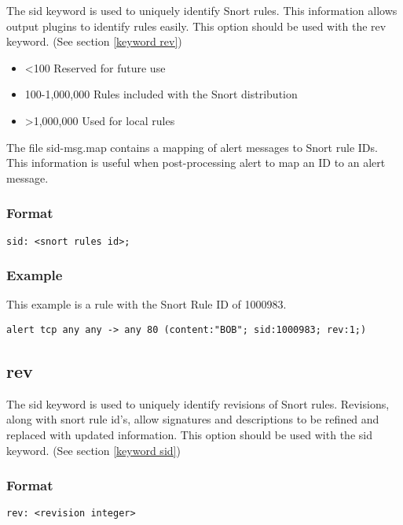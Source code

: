 \documentclass[english]{report}
\begin{document}
The sid keyword is used to uniquely identify Snort rules. This information
allows output plugins to identify rules easily.  This option should be used
with the rev keyword.  (See section \ref{keyword rev})

\begin{itemize}
\item <100 Reserved for future use
\item 100-1,000,000 Rules included with the Snort distribution
\item >1,000,000 Used for local rules
\end{itemize}

The file sid-msg.map contains a mapping of alert messages to Snort rule IDs.
This information is useful when post-processing alert to map an ID to an alert
message.  

\subsubsection{Format}

\begin{verbatim}
sid: <snort rules id>;
\end{verbatim}

\subsubsection{Example}
This example is a rule with the Snort Rule ID of 1000983.
\begin{verbatim}
alert tcp any any -> any 80 (content:"BOB"; sid:1000983; rev:1;)
\end{verbatim}

\subsection{rev \label{keyword rev}}

The sid keyword is used to uniquely identify revisions of Snort rules.
Revisions, along with snort rule id's, allow signatures and descriptions to be
refined and replaced with updated information.  This option should be used with
the sid keyword.  (See section \ref{keyword sid})

\subsubsection{Format}

\begin{verbatim}
rev: <revision integer>
\end{verbatim}
\end{document}
